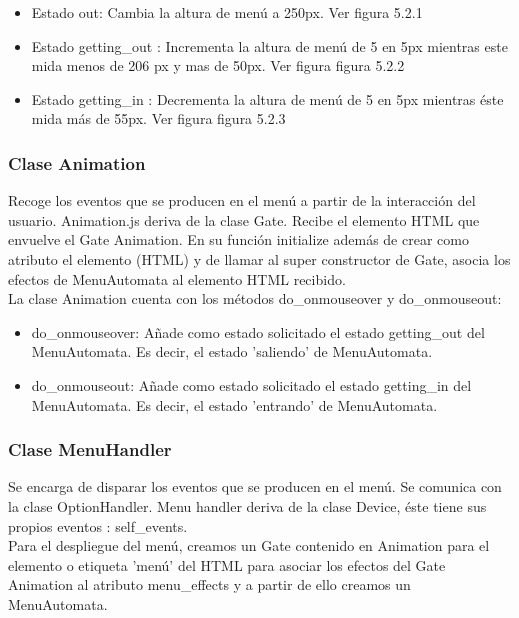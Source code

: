\begin{itemize}
 \item Estado out: Cambia la altura de menú a 250px. Ver figura 5.2.1

 \item Estado getting\_out : Incrementa la altura de menú de 5 en 5px  mientras este mida menos de 206 px y mas de 50px. Ver figura figura 5.2.2

 \item Estado getting\_in : Decrementa la altura de menú de 5 en 5px  mientras éste mida  más de 55px. Ver figura figura 5.2.3
\end{itemize}


\subsubsection{Clase Animation}
\label{subsubsection:animation}

Recoge los eventos que se producen en el menú a partir de la interacción del usuario. Animation.js deriva de la clase Gate.
Recibe el elemento HTML que envuelve  el Gate Animation. En su función initialize además de crear como atributo  el elemento (HTML) y de llamar
al super constructor de Gate, asocia los efectos de MenuAutomata al elemento HTML recibido.\\

La clase Animation cuenta con los métodos do\_onmouseover y do\_onmouseout:
\begin{itemize}
 \item do\_onmouseover: Añade como estado solicitado el estado getting\_out del MenuAutomata.
Es decir, el estado 'saliendo' de MenuAutomata.

 \item do\_onmouseout: Añade como estado solicitado el estado getting\_in del MenuAutomata.
Es decir, el estado 'entrando' de MenuAutomata.
\end{itemize}

\subsubsection{Clase MenuHandler}
\label{subsubsection:menu_handler}

Se encarga de disparar los eventos que se producen en el menú. Se comunica con la clase OptionHandler.
Menu handler deriva de la clase Device, éste  tiene sus propios eventos : self\_events.\\

Para el despliegue del menú, creamos un Gate contenido en Animation para el elemento o etiqueta 'menú' del HTML para asociar los efectos del 
Gate Animation al atributo menu\_effects y a partir de ello creamos un MenuAutomata.\\

